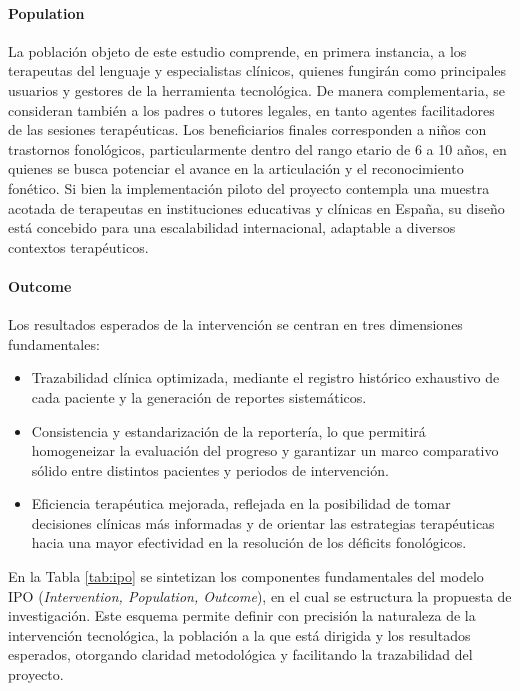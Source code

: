 \documentclass[12pt, oneside]{article}
\begin{document}
\paragraph{\textbf{Population}}

La población objeto de este estudio comprende, en primera instancia, a los terapeutas del lenguaje y especialistas clínicos, quienes fungirán como principales usuarios y gestores de la herramienta tecnológica. De manera complementaria, se consideran también a los padres o tutores legales, en tanto agentes facilitadores de las sesiones terapéuticas. Los beneficiarios finales corresponden a niños con trastornos fonológicos, particularmente dentro del rango etario de 6 a 10 años, en quienes se busca potenciar el avance en la articulación y el reconocimiento fonético. Si bien la implementación piloto del proyecto contempla una muestra acotada de terapeutas en instituciones educativas y clínicas en España, su diseño está concebido para una escalabilidad internacional, adaptable a diversos contextos terapéuticos.

\paragraph{\textbf{Outcome}}



Los resultados esperados de la intervención se centran en tres dimensiones fundamentales:

\begin{itemize}
    \item Trazabilidad clínica optimizada, mediante el registro histórico exhaustivo de cada paciente y la generación de reportes sistemáticos.
    \item Consistencia y estandarización de la reportería, lo que permitirá homogeneizar la evaluación del progreso y garantizar un marco comparativo sólido entre distintos pacientes y periodos de intervención.
    \item Eficiencia terapéutica mejorada, reflejada en la posibilidad de tomar decisiones clínicas más informadas y de orientar las estrategias terapéuticas hacia una mayor efectividad en la resolución de los déficits fonológicos.
\end{itemize}

En la Tabla \ref{tab:ipo} se sintetizan los componentes fundamentales del modelo IPO (\textit{Intervention, Population, Outcome}), en el cual se estructura la propuesta de investigación. Este esquema permite definir con precisión la naturaleza de la intervención tecnológica, la población a la que está dirigida y los resultados esperados, otorgando claridad metodológica y facilitando la trazabilidad del proyecto. 
\end{document}

